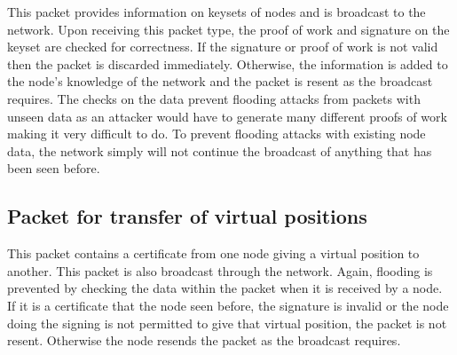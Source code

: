 \documentclass[ %
                    author={Luke Murray},
                supervisor={Dr. Simon Hollis},
                     title={Shadow Peer-to-Peer Networks},
                  subtitle={},
                    degree={MEng},
                      year={2013} ]{thesis}
\begin{document}
This packet provides information on keysets of nodes and is broadcast to the network. Upon receiving this packet type, the proof of work and signature on the keyset are checked for correctness. If the signature or proof of work is not valid then the packet is discarded immediately. Otherwise, the information is added to the node's knowledge of the network and the packet is resent as the broadcast requires. The checks on the data prevent flooding attacks from packets with unseen data as an attacker would have to generate many different proofs of work making it very difficult to do. To prevent flooding attacks with existing node data, the network simply will not continue the broadcast of anything that has been seen before.

\subsection{Packet for transfer of virtual positions}

This packet contains a certificate from one node giving a virtual position to another. This packet is also broadcast through the network. Again, flooding is prevented by checking the data within the packet when it is received by a node. If it is a certificate that the node seen before, the signature is invalid or the node doing the signing is not permitted to give that virtual position, the packet is not resent. Otherwise the node resends the packet as the broadcast requires.


\end{document}
